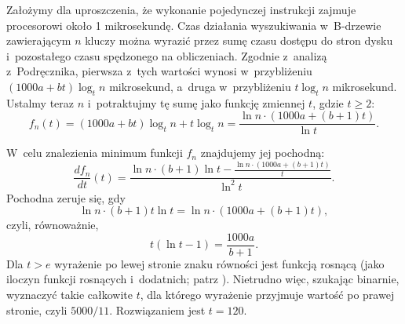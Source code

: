 \exercise %

\noindent Założymy dla uproszczenia, że wykonanie pojedynczej instrukcji zajmuje procesorowi około 1 mikrosekundę.
Czas działania wyszukiwania w~B-drzewie zawierającym $n$ kluczy można wyrazić przez sumę czasu dostępu do stron dysku i~pozostałego czasu spędzonego na obliczeniach.
Zgodnie z~analizą z~Podręcznika, pierwsza z~tych wartości wynosi w~przybliżeniu $(1000a+bt)\log_tn$ mikrosekund, a~druga w~przybliżeniu $t\log_tn$ mikrosekund.
Ustalmy teraz $n$ i~potraktujmy tę sumę jako funkcję zmiennej $t$, gdzie $t\ge2$:
\[
	f_n(t) = (1000a+bt)\log_tn+t\log_tn = \frac{\ln n\cdot(1000a+(b+1)t)}{\ln t}.
\]

W~celu znalezienia minimum funkcji $f_n$ znajdujemy jej pochodną:
\[
	\frac{df_n}{dt}(t) = \frac{\ln n\cdot(b+1)\ln t-\frac{\ln n\cdot(1000a+(b+1)t)}{t}}{\ln^2t}.
\]
Pochodna zeruje się, gdy
\[
	\ln n\cdot(b+1)t\ln t = \ln n\cdot(1000a+(b+1)t),
\]
czyli, równoważnie,
\[
	t(\ln t-1) = \frac{1000a}{b+1}.
\]
Dla $t>e$ wyrażenie po lewej stronie znaku równości jest funkcją rosnącą (jako iloczyn funkcji rosnących i~dodatnich; patrz ).
Nietrudno więc, szukając binarnie, wyznaczyć takie całkowite $t$, dla którego wyrażenie przyjmuje wartość po prawej stronie, czyli $5000/11$.
Rozwiązaniem jest $t=120$.
